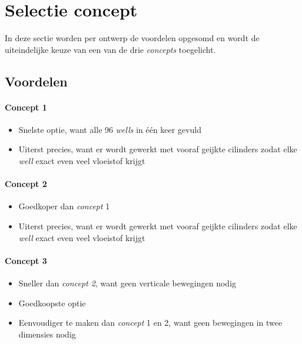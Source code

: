 \documentclass[a4paper,twoside,kulak]{kulakreport} %
\begin{document}
\section{Selectie concept}
In deze sectie worden per ontwerp de voordelen opgesomd en wordt de uiteindelijke keuze van een van de drie \textit{concepts} toegelicht.

\subsection{Voordelen}

\paragraph{Concept 1}
\begin{itemize}
	\item Snelste optie, want alle 96 \textit{wells} in één keer gevuld
	\item Uiterst precies, want er wordt gewerkt met vooraf geijkte cilinders zodat elke 	\textit{well} exact even veel vloeistof krijgt
\end{itemize}

\paragraph{Concept 2}
\begin{itemize}
	\item Goedkoper dan \textit{concept} 1
	\item Uiterst precies, want er wordt gewerkt met vooraf geijkte cilinders zodat elke 	\textit{well} exact even veel vloeistof krijgt
\end{itemize}

\paragraph{Concept 3}
\begin{itemize}
	\item Sneller dan \textit{concept 2}, want geen verticale bewegingen nodig
	\item Goedkoopste optie
	\item Eenvoudiger te maken dan \textit{concept} 1 en 2, want geen bewegingen in twee dimensies nodig
\end{itemize}
\end{document}
